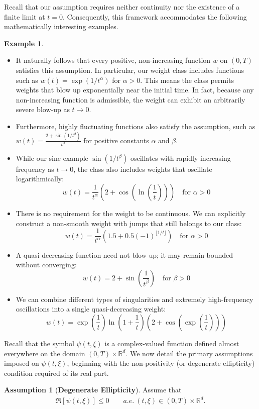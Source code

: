 \documentclass[11pt,reqno]{amsart}
\theoremstyle{definition}
\newtheorem{example}[thm]{Example}
\newtheorem{assumption}[thm]{Assumption}
\theoremstyle{remark}
\newcommand\bR{\mathbb{R}}
\numberwithin{equation}{section}
\begin{document}
Recall that our assumption requires neither continuity nor the existence of a finite limit at $t=0$. 
Consequently, this framework accommodates the following mathematically interesting examples.
\begin{example}
\begin{itemize}
\item It naturally follows that every positive, non-increasing function $w$ on $(0,T)$ satisfies this assumption. In particular, our weight class includes functions such as $w(t) = \exp(1/t^\alpha)$ for $\alpha > 0$. This means the class permits weights that blow up exponentially near the initial time. In fact, because any non-increasing function is admissible, the weight can exhibit an arbitrarily severe blow-up as $t \to 0$.

\item Furthermore, highly fluctuating functions also satisfy the assumption, such as $w(t) = \frac{2 + \sin(1/t^\beta)}{t^\alpha}$ for positive constants $\alpha$ and $\beta$. 


\item While our sine example $\sin(1/t^\beta)$ oscillates with rapidly increasing frequency as $t \to 0$, the class also includes weights that oscillate logarithmically:
$$
w(t) = \frac{1}{t^\alpha} \left( 2 + \cos\left( \ln\left( \frac{1}{t} \right) \right) \right) \quad \text{for } \alpha > 0
$$

\item There is no requirement for the weight to be continuous. 
We can explicitly construct a non-smooth weight with jumps that still belongs to our class:
$$
w(t) = \frac{1}{t^\alpha} \left( 1.5 + 0.5(-1)^{\lfloor 1/t \rfloor} \right) \quad \text{for } \alpha > 0
$$

\item A quasi-decreasing function need not blow up; it may remain bounded without converging:
$$
w(t) = 2 + \sin\left(\frac{1}{t^\beta}\right) \quad \text{for } \beta > 0
$$

\item We can combine different types of singularities and extremely high-frequency oscillations into a single quasi-decreasing weight:
$$
w(t) = \exp\left(\frac{1}{t}\right) \ln\left(1 + \frac{1}{t}\right) \left( 2 + \cos\left( \exp\left(\frac{1}{t}\right) \right) \right)
$$

\end{itemize}
\end{example}

Recall that the symbol $\psi(t,\xi)$ is a complex-valued function defined almost everywhere on the domain $(0,T) \times \mathbb{R}^d$. 
We now detail the primary assumptions imposed on $\psi(t,\xi)$, beginning with the non-positivity (or degenerate ellipticity) condition required of its real part.
\begin{assumption}[\bf Degenerate Ellipticity]
										\label{main as}
Assume that 
\begin{align}
									\label{elliptic con}
\Re[\psi(t,\xi)] \leq 0  \qquad a.e.~ (t,\xi)  \in (0,T) \times \bR^d.
\end{align}
\end{assumption}
\end{document}
